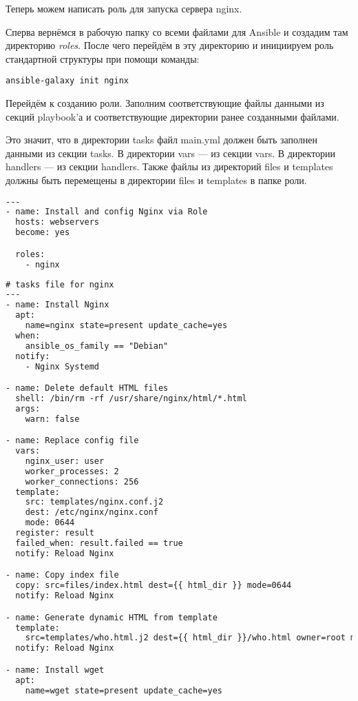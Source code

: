 Теперь можем написать роль для запуска сервера nginx.\par
Сперва вернёмся в рабочую папку со всеми файлами для
Ansible и создадим там директорию \textit{roles}. После чего перейдём в эту
директорию и инициируем роль стандартной структуры при помощи команды:

\begin{verbatim}
ansible-galaxy init nginx
\end{verbatim}

Перейдём к созданию роли. Заполним соответствующие файлы данными
из секций playbook’а и соответствующие директории ранее созданными
файлами.\par
Это значит, что в директории tasks файл main.yml должен быть
заполнен данными из секции tasks. В директории vars --- из секции vars. В
директории handlers --- из секции handlers. Также файлы из директорий
files и templates должны быть перемещены в директории files и
templates в папке роли.\par

\begin{lstlisting}[language=xml
	, caption=\leftline{Playbook для запуска роли}
	]
---
- name: Install and config Nginx via Role
  hosts: webservers
  become: yes

  roles:
    - nginx
\end{lstlisting}

\begin{lstlisting}[language=xml
	, caption=\leftline{Сценарии task, используемые в роли}
	]
# tasks file for nginx
---
- name: Install Nginx
  apt:
    name=nginx state=present update_cache=yes
  when:
    ansible_os_family == "Debian"
  notify:
    - Nginx Systemd

- name: Delete default HTML files
  shell: /bin/rm -rf /usr/share/nginx/html/*.html
  args:
    warn: false

- name: Replace config file
  vars:
    nginx_user: user
    worker_processes: 2
    worker_connections: 256
  template:
    src: templates/nginx.conf.j2
    dest: /etc/nginx/nginx.conf
    mode: 0644
  register: result
  failed_when: result.failed == true
  notify: Reload Nginx

- name: Copy index file
  copy: src=files/index.html dest={{ html_dir }} mode=0644
  notify: Reload Nginx

- name: Generate dynamic HTML from template
  template:
    src=templates/who.html.j2 dest={{ html_dir }}/who.html owner=root mode=0644
  notify: Reload Nginx

- name: Install wget
  apt:
    name=wget state=present update_cache=yes
\end{lstlisting}

